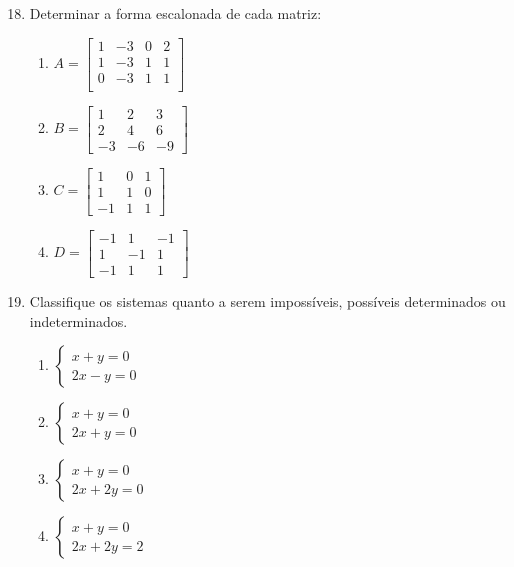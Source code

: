 \documentclass[oneside,a4paper,12pt]{article}
\begin{document}
\begin{enumerate}

	\setcounter{enumi}{17}

	\item Determinar a forma escalonada de cada matriz:
	\begin{multicols}{2}
	\begin{enumerate}
		\item $A=\left[
		\begin{array}{cccc}
		1	&	-3	&	0	&	2 \\
		1	&	-3	&	1	&	1 \\
		0	&	-3	&	1	&	1 \\
		\end{array}
		\right]
		$
		\item $B=\left[
		\begin{array}{ccc}
		1	&	2	&	3	\\
		2	&	4	&	6	\\
		-3	&	-6	&	-9
		\end{array}
		\right]
		$
		\item $C=\left[
		\begin{array}{ccc}
		1	&	0	&	1	\\
		1	&	1	&	0	\\
		-1	&	1	&	1
		\end{array}
		\right]
		$
		\item $D = \left[
		\begin{array}{ccc}
		-1	&	1	&	-1	\\
		1	&	-1	&	1	\\
		-1	&	1	&	1
		\end{array}
		\right]$
	\end{enumerate}
	\end{multicols}



	\item Classifique os sistemas quanto a serem impossíveis, possíveis determinados ou indeterminados.
	\begin{multicols}{2}
	\begin{enumerate}
			\item $\begin{cases}
				x + y = 0 \\
				2x - y = 0
			\end{cases}$
			\item $\begin{cases}
			x + y = 0 \\
			2x + y = 0
			\end{cases}$
			\item $\begin{cases}
			x + y = 0 \\
			2x + 2y = 0
			\end{cases}$
			\item $\begin{cases}
			x + y = 0 \\
			2x + 2y = 2
			\end{cases}$
	\end{enumerate}
	\end{multicols}


\end{enumerate}
\end{document}
